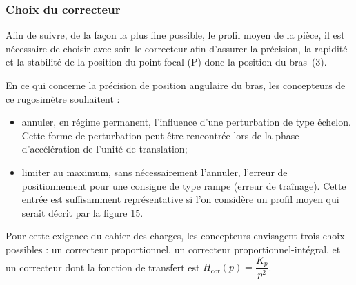 \subsubsection{Choix du correcteur}

\ifprof
\else
Afin de suivre, de la façon la plus fine possible, le profil moyen de la pièce, il est nécessaire de choisir
avec soin le correcteur afin d’assurer la précision, la rapidité et la stabilité de la position du point focal (P)
donc la position du bras~(3).

En ce qui concerne la précision de position angulaire du bras, les concepteurs de ce rugosimètre
souhaitent :
\begin{itemize}
\item annuler, en régime permanent, l’influence d’une perturbation de type échelon. Cette forme de
perturbation peut être rencontrée lors de la phase d’accélération de l’unité de translation;
\item limiter au maximum, sans nécessairement l’annuler, l’erreur de positionnement pour une consigne
de type rampe (erreur de traînage). Cette entrée est suffisamment représentative si l’on considère un
profil moyen qui serait décrit par la figure 15.
\end{itemize}
Pour cette exigence du cahier des charges, les concepteurs envisagent trois choix possibles : un correcteur
proportionnel, un correcteur proportionnel-intégral, et un correcteur dont la fonction de transfert est
$H_{\text{cor}}(p) = \dfrac{K_p}{p^2}$.

\fi

